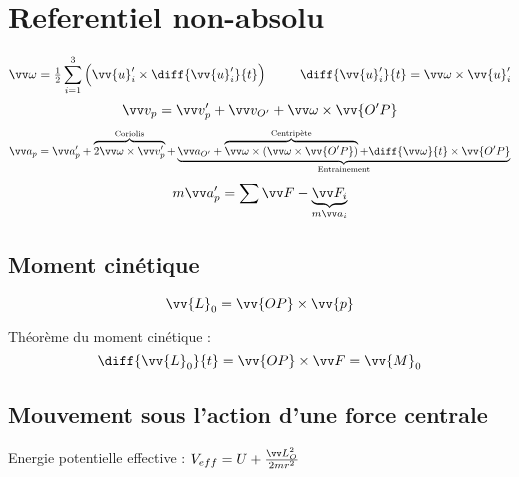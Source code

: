 \documentclass[../main.tex]{subfiles}
\begin{document}
\section{Referentiel non-absolu}
\[
  \vian=\tfrac{1}{2}\sum_{i=1}^{3}\left(\vv{u}_i'\times\diff{\vv{u}_i'}{t}\right) \phantom{thisis} \diff{\vv{u}_i'}{t}=\vian\times\vv{u}_i'
\]
\[
  \vi_p=\vi_p'+\vi_{O'} + \vian\times\vv{O'P}
\]
\[
  \ac_p = \ac_p' + \overbrace{2\vian\times\vi_p'}^{\text{Coriolis}} + \underbrace{\ac_{O'} + \overbrace{\vian\times(\vian\times\vv{O'P})}^{\text{Centripète}} + \diff{\vian}{t}\times\vv{O'P}}_{\text{Entrainement}}
\]
\[
  m\ac_p'=\sum\F - \underbrace{\F_i}_{m\ac_i}
\]

\subsection{Moment cinétique}
\[
  \vv{L}_0=\vv{OP}\times\vv{p}
\]

Théorème du moment cinétique :
\[
  \diff{\vv{L}_0}{t}=\vv{OP}\times\F=\vv{M}_0
\]


\subsection{Mouvement sous l'action d'une force centrale}
Energie potentielle effective : \(V_{eff}=U+\frac{\mc_O^2}{2mr^2}\)

\end{document}
